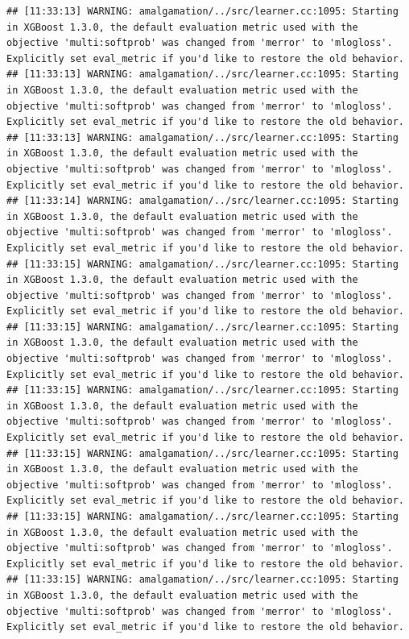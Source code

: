 \documentclass[
]{scrbook}
\begin{document}
\begin{verbatim}
## [11:33:13] WARNING: amalgamation/../src/learner.cc:1095: Starting in XGBoost 1.3.0, the default evaluation metric used with the objective 'multi:softprob' was changed from 'merror' to 'mlogloss'. Explicitly set eval_metric if you'd like to restore the old behavior.
## [11:33:13] WARNING: amalgamation/../src/learner.cc:1095: Starting in XGBoost 1.3.0, the default evaluation metric used with the objective 'multi:softprob' was changed from 'merror' to 'mlogloss'. Explicitly set eval_metric if you'd like to restore the old behavior.
## [11:33:13] WARNING: amalgamation/../src/learner.cc:1095: Starting in XGBoost 1.3.0, the default evaluation metric used with the objective 'multi:softprob' was changed from 'merror' to 'mlogloss'. Explicitly set eval_metric if you'd like to restore the old behavior.
## [11:33:14] WARNING: amalgamation/../src/learner.cc:1095: Starting in XGBoost 1.3.0, the default evaluation metric used with the objective 'multi:softprob' was changed from 'merror' to 'mlogloss'. Explicitly set eval_metric if you'd like to restore the old behavior.
## [11:33:15] WARNING: amalgamation/../src/learner.cc:1095: Starting in XGBoost 1.3.0, the default evaluation metric used with the objective 'multi:softprob' was changed from 'merror' to 'mlogloss'. Explicitly set eval_metric if you'd like to restore the old behavior.
## [11:33:15] WARNING: amalgamation/../src/learner.cc:1095: Starting in XGBoost 1.3.0, the default evaluation metric used with the objective 'multi:softprob' was changed from 'merror' to 'mlogloss'. Explicitly set eval_metric if you'd like to restore the old behavior.
## [11:33:15] WARNING: amalgamation/../src/learner.cc:1095: Starting in XGBoost 1.3.0, the default evaluation metric used with the objective 'multi:softprob' was changed from 'merror' to 'mlogloss'. Explicitly set eval_metric if you'd like to restore the old behavior.
## [11:33:15] WARNING: amalgamation/../src/learner.cc:1095: Starting in XGBoost 1.3.0, the default evaluation metric used with the objective 'multi:softprob' was changed from 'merror' to 'mlogloss'. Explicitly set eval_metric if you'd like to restore the old behavior.
## [11:33:15] WARNING: amalgamation/../src/learner.cc:1095: Starting in XGBoost 1.3.0, the default evaluation metric used with the objective 'multi:softprob' was changed from 'merror' to 'mlogloss'. Explicitly set eval_metric if you'd like to restore the old behavior.
## [11:33:15] WARNING: amalgamation/../src/learner.cc:1095: Starting in XGBoost 1.3.0, the default evaluation metric used with the objective 'multi:softprob' was changed from 'merror' to 'mlogloss'. Explicitly set eval_metric if you'd like to restore the old behavior.

\end{verbatim}
\end{document}
